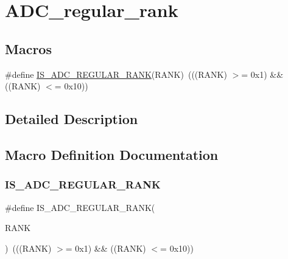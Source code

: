 \hypertarget{group___a_d_c__regular__rank}{}\section{A\+D\+C\+\_\+regular\+\_\+rank}
\label{group___a_d_c__regular__rank}
\subsection*{Macros}
\begin{DoxyCompactItemize}
\item 
\#define \mbox{\hyperlink{group___a_d_c__regular__rank_ga5928a1e9315f798e27220b91f1bae7f2}{I\+S\+\_\+\+A\+D\+C\+\_\+\+R\+E\+G\+U\+L\+A\+R\+\_\+\+R\+A\+NK}}(R\+A\+NK)~(((R\+A\+NK) $>$= 0x1) \&\& ((\+R\+A\+N\+K) $<$= 0x10))
\end{DoxyCompactItemize}


\subsection{Detailed Description}


\subsection{Macro Definition Documentation}
\mbox{\label{group___a_d_c__regular__rank_ga5928a1e9315f798e27220b91f1bae7f2}} 
\subsubsection{\texorpdfstring{IS\_ADC\_REGULAR\_RANK}{IS\_ADC\_REGULAR\_RANK}}
{\footnotesize\ttfamily \#define I\+S\+\_\+\+A\+D\+C\+\_\+\+R\+E\+G\+U\+L\+A\+R\+\_\+\+R\+A\+NK(\begin{DoxyParamCaption}\item[{}]{R\+A\+NK }\end{DoxyParamCaption})~(((R\+A\+NK) $>$= 0x1) \&\& ((\+R\+A\+N\+K) $<$= 0x10))}

